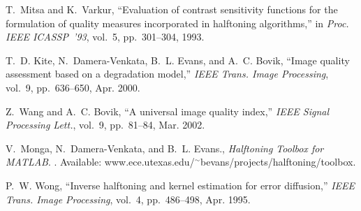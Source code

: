 \documentclass[11pt]{article}
\begin{document}
\begin{thebibliography}{10}
T.~Mitsa and K.~Varkur, ``Evaluation of contrast sensitivity functions for the
  formulation of quality measures incorporated in halftoning algorithms,'' in
  {\em Proc. IEEE ICASSP~'93}, vol.~5, pp.~301--304, 1993.

T.~D. Kite, N.~Damera-Venkata, B.~L. Evans, and A.~C. Bovik, ``Image quality
  assessment based on a degradation model,'' {\em IEEE Trans. Image
  Processing}, vol.~9, pp.~636--650, Apr. 2000.

Z.~Wang and A.~C. Bovik, ``A universal image quality index,'' {\em IEEE Signal
  Processing Lett.}, vol.~9, pp.~81--84, Mar. 2002.

V.~Monga, N.~Damera-Venkata, and B.~L. Evans., {\em Halftoning Toolbox for
  MATLAB}.
.
\newblock Available:
  www.ece.utexas.edu/$^\sim$bevans/projects/halftoning/toolbox.

P.~W. Wong, ``Inverse halftoning and kernel estimation for error diffusion,''
  {\em IEEE Trans. Image Processing}, vol.~4, pp.~486--498, Apr. 1995.

\end{thebibliography}
\end{document}
